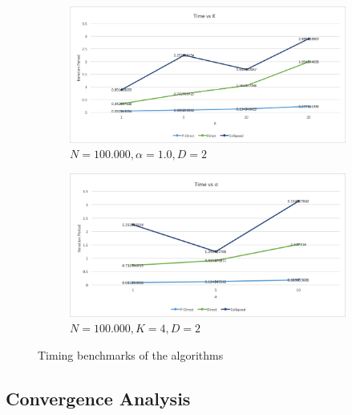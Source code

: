 \documentclass[a4paper]{article}
\begin{document}
\begin{figure}[H]
  \begin{subfigure}[t]{.4\textwidth}
    \centering
    \includegraphics[width=\linewidth]{img/N100000KVKValpha1D2.png}
    \caption{$N=100.000, \alpha=1.0, D=2$}
  \end{subfigure}
  \hfill
  \begin{subfigure}[t]{.4\textwidth}
    \centering
    \includegraphics[width=\linewidth]{img/N100000K5K5alphaVD2.png}
     \caption{$N=100.000, K=4, D=2$}
  \end{subfigure}
    \caption{Timing benchmarks of the algorithms}
\end{figure}



\subsection{Convergence Analysis}


\end{document}
